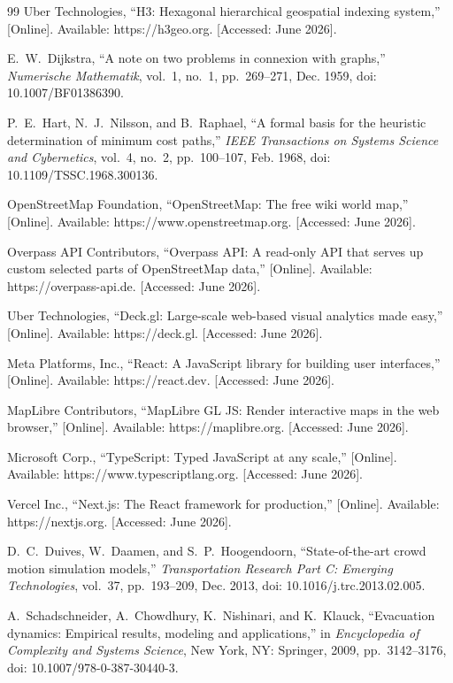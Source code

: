 \documentclass[12pt,a4paper,oneside]{report}
\begin{document}
\begin{thebibliography}{99}
Uber Technologies, ``H3: Hexagonal hierarchical geospatial indexing system,'' [Online]. Available: https://h3geo.org. [Accessed: June 2026].

E.~W.~Dijkstra, ``A note on two problems in connexion with graphs,'' \emph{Numerische Mathematik}, vol.~1, no.~1, pp.~269--271, Dec. 1959, doi: 10.1007/BF01386390.

P.~E.~Hart, N.~J.~Nilsson, and B.~Raphael, ``A formal basis for the heuristic determination of minimum cost paths,'' \emph{IEEE Transactions on Systems Science and Cybernetics}, vol.~4, no.~2, pp.~100--107, Feb. 1968, doi: 10.1109/TSSC.1968.300136.

OpenStreetMap Foundation, ``OpenStreetMap: The free wiki world map,'' [Online]. Available: https://www.openstreetmap.org. [Accessed: June 2026].

Overpass API Contributors, ``Overpass API: A read-only API that serves up custom selected parts of OpenStreetMap data,'' [Online]. Available: https://overpass-api.de. [Accessed: June 2026].

Uber Technologies, ``Deck.gl: Large-scale web-based visual analytics made easy,'' [Online]. Available: https://deck.gl. [Accessed: June 2026].

Meta Platforms, Inc., ``React: A JavaScript library for building user interfaces,'' [Online]. Available: https://react.dev. [Accessed: June 2026].

MapLibre Contributors, ``MapLibre GL JS: Render interactive maps in the web browser,'' [Online]. Available: https://maplibre.org. [Accessed: June 2026].

Microsoft Corp., ``TypeScript: Typed JavaScript at any scale,'' [Online]. Available: https://www.typescriptlang.org. [Accessed: June 2026].

Vercel Inc., ``Next.js: The React framework for production,'' [Online]. Available: https://nextjs.org. [Accessed: June 2026].

D.~C.~Duives, W.~Daamen, and S.~P.~Hoogendoorn, ``State-of-the-art crowd motion simulation models,'' \emph{Transportation Research Part C: Emerging Technologies}, vol.~37, pp.~193--209, Dec. 2013, doi: 10.1016/j.trc.2013.02.005.

A.~Schadschneider, A.~Chowdhury, K.~Nishinari, and K.~Klauck, ``Evacuation dynamics: Empirical results, modeling and applications,'' in \emph{Encyclopedia of Complexity and Systems Science}, New York, NY: Springer, 2009, pp.~3142--3176, doi: 10.1007/978-0-387-30440-3.


\end{thebibliography}
\end{document}
